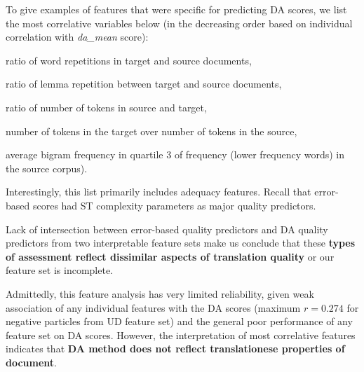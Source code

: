To give examples of features that were specific for predicting DA scores, we list the most correlative variables below (in the decreasing order based on individual correlation with \textit{da\_mean} score): 
\begin{description}\compresslist{}
	\item[9992] ratio of word repetitions in target and source documents,
	\item[9993] ratio of lemma repetition between target and source documents,
	\item[1003] ratio of number of tokens in source and target,
	\item[1004] number of tokens in the target over number of tokens in the source,
	\item[1052] average bigram frequency in quartile 3 of frequency (lower frequency words) in the source corpus).
\end{description}

Interestingly, this list primarily includes adequacy features. Recall that error-based scores had ST complexity parameters as major quality predictors. 

Lack of intersection between error-based quality predictors and DA quality predictors from two interpretable feature sets make us conclude that these \textbf{types of assessment reflect dissimilar aspects of translation quality} or our feature set is incomplete. 

Admittedly, this feature analysis has very limited reliability, given weak association of any individual features with the DA scores (maximum $r=0.274$ for negative particles from UD feature set) and the general poor performance of any feature set on DA scores. 
However, the interpretation of most correlative features indicates that \textbf{DA method does not reflect translationese properties of document}.

